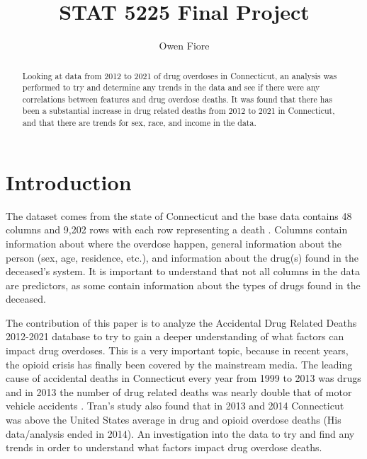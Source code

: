 \documentclass[12pt, letterpaper, titlepage]{article}
\title{STAT 5225 Final Project}
\author{Owen Fiore\\
}
\date{}
\begin{document}
\maketitle


\begin{abstract}
Looking at data from 2012 to 2021 of drug overdoses in Connecticut, an analysis was performed to try and determine any trends in the data and see if there were any correlations between features and drug overdose deaths. It was found that there has been a substantial increase in drug related deaths from 2012 to 2021 in Connecticut, and that there are trends for sex, race, and income in the data.

\end{abstract}

\doublespace


\section{Introduction} \label{sec:intro}
The dataset comes from the state of Connecticut and the base data contains 48 columns and 9,202 rows with each row representing a death \citep{data}.  Columns contain information about where the overdose happen, general information about the person (sex, age, residence, etc.), and information about the drug(s) found in the deceased's system.  It is important to understand that not all columns in the data are predictors, as some contain information about the types of drugs found in the deceased.

The contribution of this paper is to analyze the Accidental Drug Related Deaths 2012-2021 database to try to gain a deeper understanding of what factors can impact drug overdoses.  This is a very important topic, because in recent years, the opioid crisis has finally been covered by the mainstream media.  The leading cause of accidental deaths in Connecticut every year from 1999 to 2013 was drugs and in 2013 the number of drug related deaths was nearly double that of motor vehicle accidents \citep{tran_2022}.  Tran's study also found that in 2013 and 2014 Connecticut was above the United States average in drug and opioid overdose deaths (His data/analysis ended in 2014).  An investigation into the data to try and find any trends in order to understand what factors impact drug overdose deaths.
\end{document}
